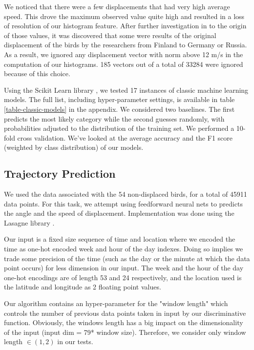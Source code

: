 \documentclass[letterpaper, 10pt, conference]{ieeeconf}  %
\begin{document}
	We noticed that there were a few displacements that had very high average speed. This drove the maximum observed value quite high and resulted in a loss of resolution of our histogram feature. After further investigation in to the origin of those values, it was discovered that some were results of the original displacement of the birds by the researchers from Finland to Germany or Russia. As a result, we ignored any displacement vector with norm above 12 m/s in the computation of our histograms. 185 vectors out of a total of 33284 were ignored because of this choice.

	Using the Scikit Learn library \cite{sklearn}, we tested 17 instances of classic machine learning models. The full list, including hyper-parameter settings, is available in table \ref{table-classic-models} in the appendix. We considered two baselines. The first predicts the most likely category while the second guesses randomly, with probabilities adjusted to the distribution of the training set. We performed a 10-fold cross validation. We've looked at the average accuracy and the F1 score (weighted by class distribution) of our models.

\subsection{Trajectory Prediction}
	We used the data associated with the 54 non-displaced birds, for a total of 45911 data points. For this task, we attempt using feedforward neural nets to predicts the angle and the speed of displacement. Implementation was done using the Lasagne library \cite{lasagne}.

	Our input is a fixed size sequence of time and location where we encoded the time as one-hot encoded week and hour of the day indexes. Doing so implies we trade some precision of the time (such as the day or the minute at which the data point occurs) for less dimension in our input. The week and the hour of the day one-hot encodings are of length 53 and 24 respectively, and the location used is the latitude and longitude as 2 floating point values.

	Our algorithm contains an hyper-parameter for the "window length" which controls the number of previous data points taken in input by our discriminative function. Obviously, the windows length has a big impact on the dimensionality of the input (input dim = 79* window size). Therefore, we consider only window length $\in (1,2)$ in our tests.
\end{document}
